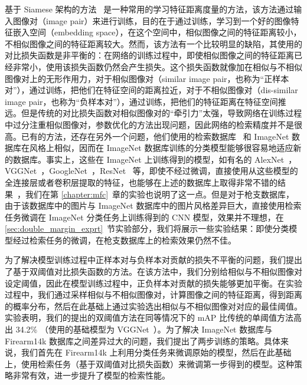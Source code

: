 基于 Siamese 架构的方法~\cite{Radenovic2016CNNIR,Chopra2005LearningAS,Bell2015LearningVS} 是一种常用的学习特征距离度量的方法，该方法通过输入图像对（image pair）来进行训练，目的在于通过训练，学习到一个好的图像特征嵌入空间（embedding space），在这个空间中，相似图像之间的特征距离较小，不相似图像之间的特征距离较大。然而，该方法有一个比较明显的缺陷，其使用的对比损失函数是非平衡的：在网络的训练过程中，即使相似图像之间的特征距离已经非常小，使用该损失函数仍然会产生损失。这个损失函数就像加在相似与不相似图像对上的无形作用力，对于相似图像对（similar image pair，也称为“正样本对”），通过训练，把他们在特征空间的距离拉近，对于不相似图像对（dis-similar image pair，也称为“负样本对”），通过训练，把他们的特征距离在特征空间推远。但是传统的对比损失函数对相似图像对的“牵引力”太强，导致网络在训练过程中过分注重相似图像对，参数优化的方法出现问题，因此网络的检索精度并不是很高。已有的方法，还存在另外一个问题，他们使用的检索数据库~\cite{Philbin2007ObjectRW,Philbin2008LostIQ} 和 ImageNet 数据库在风格上相似，因而在 ImageNet 数据库训练的分类模型能够很容易地适应新的数据库。事实上，这些在 ImageNet 上训练得到的模型，如有名的 AlexNet~\cite{Krizhevsky2012ImageNetCW}，VGGNet~\cite{Simonyan2014VeryDC}，GoogleNet~\cite{Szegedy2015GoingDW}，ResNet~\cite{He2016DeepRL} 等，即使不经过微调，直接使用从这些模型的全连接层或者卷积层提取的特征，也能够在上述的数据库上取得非常不错的结果~\cite{Babenko2014NeuralCF,Babenko2015AggregatingLD,Tolias2015ParticularOR}，我们在第 \ref{chapter:mfc}~章的实验也说明了这一点。但是对于枪支数据库，由于该数据库中的图片与 ImageNet 数据库中的图片风格差异巨大，直接使用检索任务微调在 ImageNet 分类任务上训练得到的 CNN 模型，效果并不理想，在 \ref{sec:double_margin_exprt}~节实验部分，我们将展示一些实验结果：即使分类模型经过检索任务的微调，在枪支数据库上的检索效果仍然不佳。

为了解决模型训练过程中正样本对与负样本对贡献的损失不平衡的问题，我们提出了基于双阈值对比损失函数的方法。在该方法中，我们分别给相似与不相似图像对设定阈值，因此在模型训练过程中，正负样本对贡献的损失能够更加平衡。在实验过程中，我们通过采样相似与不相似图像对，计算图像之间的特征距离，得到距离的概率分布，然后在此基础上通过实验选出相似与不相似图像对对应的最佳阈值。实验表明，我们的提出的双阈值方法在同等情况下的 mAP 比传统的单阈值方法高出 34.2\% （使用的基础模型为 VGGNet~\cite{Simonyan2014VeryDC}）。为了解决 ImageNet 数据库与 Firearm14k 数据库之间差异过大的问题，我们提出了两步训练的策略。具体来说，我们首先在 Firearm14k 上利用分类任务来微调原始的模型，然后在此基础上，使用检索任务（基于双阈值对比损失函数）来微调第一步得到的模型。这种策略非常有效，进一步提升了模型的检索性能。

